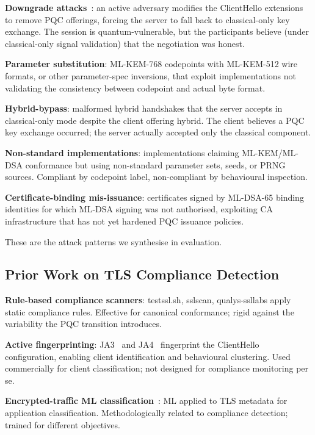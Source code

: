 \documentclass[sigconf,nonacm]{acmart}
\begin{document}
\textbf{Downgrade attacks}~\cite{guneysu2024downgrade,
celi2024hybrid}: an active adversary modifies the ClientHello
extensions to remove PQC offerings, forcing the server to
fall back to classical-only key exchange. The session is
quantum-vulnerable, but the participants believe (under
classical-only signal validation) that the negotiation was
honest.

\textbf{Parameter substitution}: ML-KEM-768 codepoints with
ML-KEM-512 wire formats, or other parameter-spec inversions, that
exploit implementations not validating the consistency between
codepoint and actual byte format.

\textbf{Hybrid-bypass}: malformed hybrid handshakes that the
server accepts in classical-only mode despite the client offering
hybrid. The client believes a PQC key exchange occurred; the
server actually accepted only the classical component.

\textbf{Non-standard implementations}: implementations claiming
ML-KEM/ML-DSA conformance but using non-standard parameter sets,
seeds, or PRNG sources. Compliant by codepoint label,
non-compliant by behavioural inspection.

\textbf{Certificate-binding mis-issuance}: certificates signed by
ML-DSA-65 binding identities for which ML-DSA signing was not
authorised, exploiting CA infrastructure that has not yet
hardened PQC issuance policies.

These are the attack patterns we synthesise in evaluation.

\subsection{Prior Work on TLS Compliance Detection}

\textbf{Rule-based compliance scanners}: testssl.sh, sslscan,
qualys-ssllabs apply static compliance rules. Effective for
canonical conformance; rigid against the variability the PQC
transition introduces.

\textbf{Active fingerprinting}: JA3~\cite{althouse2017ja3} and
JA4~\cite{salesforce2024ja4} fingerprint the ClientHello
configuration, enabling client identification and behavioural
clustering. Used commercially for client classification; not
designed for compliance monitoring per se.

\textbf{Encrypted-traffic ML classification}~\cite{taylor2024etasurv,
aceto2024etcml}: ML applied to TLS metadata for application
classification. Methodologically related to compliance detection;
trained for different objectives.
\end{document}
